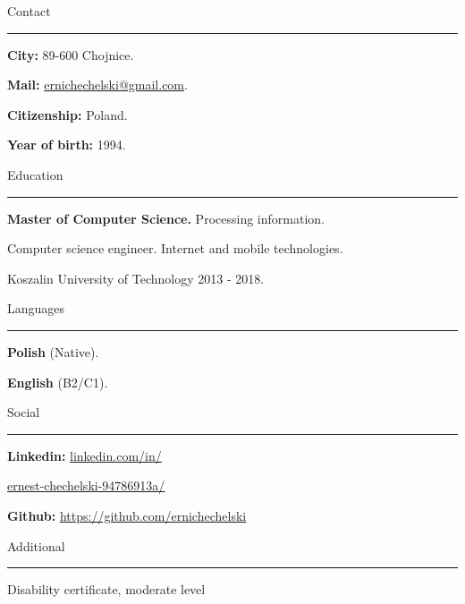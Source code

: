 \documentclass[10pt,a4paper]{article}
\newcommand{\sectiontitle}[1]{%
  {\fontsize{18}{21}\selectfont\color{lightink}#1}\par
  \vspace{3pt}\textcolor{ink}{\rule{\linewidth}{0.45pt}}\vspace{4pt}%
}
\newcommand{\field}[2]{\textbf{#1} #2\par\vspace{1.3mm}}
\newcommand{\link}[2]{\href{#1}{\underline{#2}}}
\begin{document}
\begin{minipage}[t]{0.355\textwidth}
\sectiontitle{Contact}
\field{City:}{89-600 Chojnice.}
\field{Mail:}{\link{mailto:ernichechelski@gmail.com}{ernichechelski@gmail.com}.}
\field{Citizenship:}{Poland.}
\field{Year of birth:}{1994.}

\vspace{9mm}\sectiontitle{Education}
\textbf{Master of Computer Science.} Processing information.\par
Computer science engineer. Internet and mobile technologies.\par
Koszalin University of Technology 2013 - 2018.

\vspace{9mm}\sectiontitle{Languages}
\field{Polish}{(Native).}
\field{English}{(B2/C1).}

\vspace{9mm}\sectiontitle{Social}
{\fontsize{9}{11}\selectfont
\textbf{Linkedin:} \link{https://www.linkedin.com/in/ernest-chechelski-94786913a/}{linkedin.com/in/}\par
\hspace*{13mm}\link{https://www.linkedin.com/in/ernest-chechelski-94786913a/}{ernest-chechelski-94786913a/}\par
\field{Github:}{\link{https://github.com/ernichechelski}{https://github.com/ernichechelski}}}

\vspace{9mm}\sectiontitle{Additional}
Disability certificate, moderate level
\end{minipage}\hfill
{}\hfill
\end{document}
